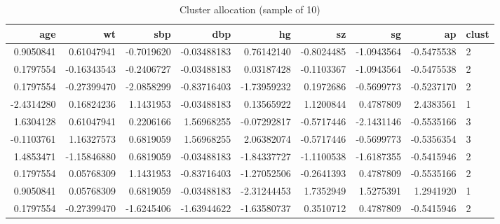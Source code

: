 \documentclass[
]{article}
\newenvironment{Shaded}{\begin{snugshade}}{\end{snugshade}}
\newcommand{\AttributeTok}[1]{\textcolor[rgb]{0.77,0.63,0.00}{#1}}
\newcommand{\ConstantTok}[1]{\textcolor[rgb]{0.00,0.00,0.00}{#1}}
\newcommand{\DecValTok}[1]{\textcolor[rgb]{0.00,0.00,0.81}{#1}}
\newcommand{\FunctionTok}[1]{\textcolor[rgb]{0.00,0.00,0.00}{#1}}
\newcommand{\NormalTok}[1]{#1}
\newcommand{\SpecialCharTok}[1]{\textcolor[rgb]{0.00,0.00,0.00}{#1}}
\newcommand{\StringTok}[1]{\textcolor[rgb]{0.31,0.60,0.02}{#1}}
\begin{document}
\begin{Shaded}
\end{Shaded}

\begin{table}

\caption{\label{tab:unnamed-chunk-50}Cluster allocation (sample of 10)}
\centering
\begin{tabular}[t]{r|r|r|r|r|r|r|r|l}
\hline
age & wt & sbp & dbp & hg & sz & sg & ap & clust\\
\hline
0.9050841 & 0.61047941 & -0.7019620 & -0.03488183 & 0.76142140 & -0.8024485 & -1.0943564 & -0.5475538 & 2\\
\hline
0.1797554 & -0.16343543 & -0.2406727 & -0.03488183 & 0.03187428 & -0.1103367 & -1.0943564 & -0.5475538 & 2\\
\hline
0.1797554 & -0.27399470 & -2.0858299 & -0.83716403 & -1.73959232 & 0.1972686 & -0.5699773 & -0.5237170 & 2\\
\hline
-2.4314280 & 0.16824236 & 1.1431953 & -0.03488183 & 0.13565922 & 1.1200844 & 0.4787809 & 2.4383561 & 1\\
\hline
1.6304128 & 0.61047941 & 0.2206166 & 1.56968255 & -0.07292817 & -0.5717446 & -2.1431146 & -0.5535166 & 3\\
\hline
-0.1103761 & 1.16327573 & 0.6819059 & 1.56968255 & 2.06382074 & -0.5717446 & -0.5699773 & -0.5356354 & 3\\
\hline
1.4853471 & -1.15846880 & 0.6819059 & -0.03488183 & -1.84337727 & -1.1100538 & -1.6187355 & -0.5415946 & 2\\
\hline
0.1797554 & 0.05768309 & 1.1431953 & -0.83716403 & -1.27052506 & -0.2641393 & 0.4787809 & -0.5535166 & 2\\
\hline
0.9050841 & 0.05768309 & 0.6819059 & -0.03488183 & -2.31244453 & 1.7352949 & 1.5275391 & 1.2941920 & 1\\
\hline
0.1797554 & -0.27399470 & -1.6245406 & -1.63944622 & -1.63580737 & 0.3510712 & 0.4787809 & -0.5415946 & 2\\
\hline
\end{tabular}
\end{table}
\end{document}
